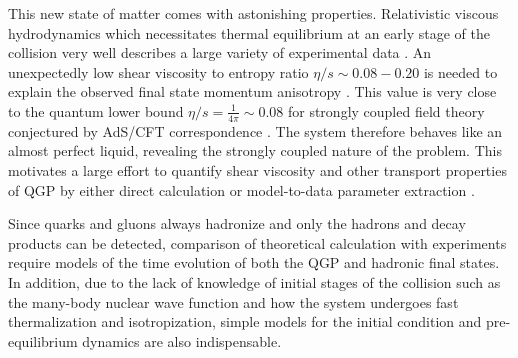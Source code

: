 \documentclass[aps,prl,twocolumn,groupedaddress]{revtex4-1}
\begin{document}
	This new state of matter comes with astonishing properties.
	Relativistic viscous hydrodynamics which necessitates thermal equilibrium at an early stage of the collision very well describes a large variety of experimental data \cite{Heinz:2013th}.
	An unexpectedly low shear viscosity to entropy ratio $\eta/s \sim 0.08 - 0.20$ is needed to explain the observed final state momentum anisotropy \cite{Song:2010mg}. This value is very close to the quantum lower bound $\eta/s = \frac{1}{4\pi} \sim 0.08$ for strongly coupled field theory conjectured by AdS/CFT correspondence \citep{Kovtun:2004de}. 
	The system therefore behaves like an almost perfect liquid, revealing the strongly coupled nature of the problem.
	This motivates a large effort to quantify shear viscosity and other transport properties of QGP by either direct calculation or model-to-data parameter extraction \citep{Shen:2015msa}.  
	
	Since quarks and gluons always hadronize and only the hadrons and decay products can be detected, comparison of theoretical calculation with experiments require models of the time evolution of both the QGP and hadronic final states.
	In addition, due to the lack of knowledge of initial stages of the collision such as the many-body nuclear wave function and how the system undergoes fast thermalization and isotropization, simple models for the initial condition and pre-equilibrium dynamics are also indispensable.
	
\end{document}
